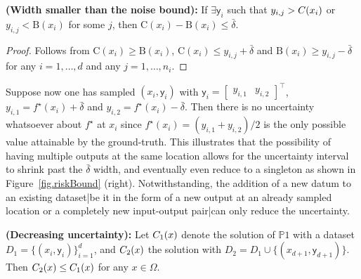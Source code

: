 \begin{proposition} 
	\label{prop.smallWidth}
	{\normalfont \textbf{(Width smaller than the noise bound):}}
	If $\exists \mathsf{y}_i$ such that $y_{i,j} > {\normalfont C}(x_i)$ or $y_{i,j} < \text{B}(x_i)$ for some $j$, then $\text{C}(x_i) - \text{B}(x_i) \leq \bar \delta$.
\end{proposition}
\begin{proof}
	Follows from $\text{C}(x_i) \geq \text{B}(x_i)$, $\text{C}(x_i) \leq y_{i,j} + \bar \delta$ and $\text{B}(x_i) \geq y_{i,j} - \bar \delta$ for any $i=1,\dots,d$ and any $j=1,\dots,n_i$.\QED 
\end{proof} 
Suppose now one has sampled $(x_i,\mathsf{y}_i)$ with $\mathsf{y}_i = \begin{bmatrix} y_{i,1} & y_{i,2} \end{bmatrix}^\top$, $y_{i,1} = f^\star(x_i) + \bar \delta$ and $y_{i,2} = f^\star(x_i) - \bar \delta$. Then there is no uncertainty whatsoever about $f^\star$ at $x_i$ since $f^\star(x_i) = (y_{i,1} + y_{i,2})/2$ is the only possible value attainable by the ground-truth. This illustrates that the possibility of having multiple outputs at the same location allows for the uncertainty interval to shrink past the $\bar \delta$ width, and eventually even reduce to a singleton as shown in Figure~\ref{fig.riskBound} (right). Notwithstanding, the addition of a new datum to an existing dataset|be it in the form of a new output at an already sampled location or a completely new input-output pair|can only reduce the uncertainty.

\begin{proposition} {\normalfont \textbf{(Decreasing uncertainty):}}
	Let $C_{{\normalfont 1}}(x)$ denote the solution of $\mathds{P}1$ with a dataset $D_1 = \{(x_i,\mathsf{y}_i)\}_{i=1}^{d}$, and $C_{{\normalfont 2}}(x)$ the solution with $D_2 = D_1 \cup \{(x_{d+1},\mathsf{y}_{d+1})\}$. Then $C_{{\normalfont 2}}(x) \leq C_{{\normalfont 1}}(x)$ for any $x \in \Omega$. 
	\label{prop.decreasing}
\end{proposition}

